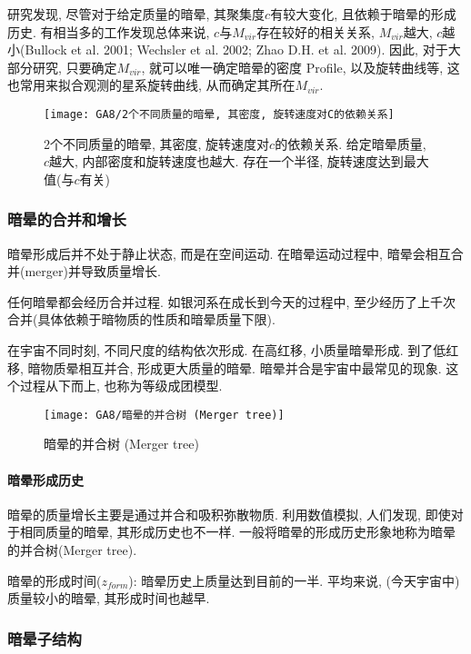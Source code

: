 {\small
研究发现, 尽管对于给定质量的暗晕, 其聚集度$c$有较大变化, 且依赖于暗晕的形成历史. 有相当多的工作发现总体来说, $c$与$M_{vir}$存在较好的相关关系, $M_{vir}$越大, $c$越小(Bullock et al. 2001; Wechsler et al. 2002; Zhao D.H. et al. 2009). 因此, 对于大部分研究, 只要确定$M_{vir}$, 就可以唯一确定暗晕的密度 Profile, 以及旋转曲线等, 这也常用来拟合观测的星系旋转曲线, 从而确定其所在$M_{vir}$. 
}

\begin{figure}[!htb]
    \centering
    \texttt{[image: GA8/2个不同质量的暗晕, 其密度, 旋转速度对C的依赖关系]}
    \caption{\small 2个不同质量的暗晕, 其密度, 旋转速度对$c$的依赖关系. 给定暗晕质量, $c$越大, 内部密度和旋转速度也越大. 存在一个半径, 旋转速度达到最大值(与$c$有关)}
\end{figure}


\subsubsection{暗晕的合并和增长}
暗晕形成后并不处于静止状态, 而是在空间运动. 在暗晕运动过程中, 暗晕会相互合并(merger)并导致质量增长. 

任何暗晕都会经历合并过程. 如银河系在成长到今天的过程中, 至少经历了上千次合并(具体依赖于暗物质的性质和暗晕质量下限). 

在宇宙不同时刻, 不同尺度的结构依次形成. 在高红移, 小质量暗晕形成. 到了低红移, 暗物质晕相互并合, 形成更大质量的暗晕. 暗晕并合是宇宙中最常见的现象. 这个过程从下而上, 也称为等级成团模型. 

\begin{figure}[!htb]
    \centering
    \texttt{[image: GA8/暗晕的并合树 (Merger tree)]}
    \caption{暗晕的并合树 (Merger tree)}
\end{figure}

\paragraph{暗晕形成历史}
暗晕的质量增长主要是通过并合和吸积弥散物质. 利用数值模拟, 人们发现, 即使对于相同质量的暗晕, 其形成历史也不一样. 一般将暗晕的形成历史形象地称为暗晕的并合树(Merger tree). 

暗晕的形成时间($z_{form}$): 暗晕历史上质量达到目前的一半. 平均来说, (今天宇宙中)质量较小的暗晕, 其形成时间也越早. 

\subsubsection{暗晕子结构}

